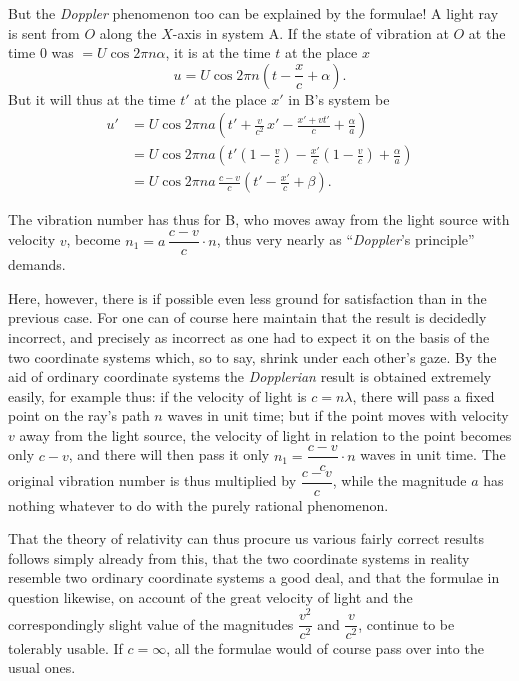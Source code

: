 \documentclass[12pt,a4paper]{article}
\begin{document}
But the \emph{Doppler} phenomenon too can be explained by the formulae! A
light ray is sent from $O$ along the $X$-axis in system A. If the state of
vibration at $O$ at the time $0$ was $= U \cos 2\pi n\alpha$, it is at the
time $t$ at the place $x$
\[
  u = U \cos 2\pi n \left(t - \frac{x}{c} + \alpha\right).
\]
But it will thus at the time $t'$ at the place $x'$ in B's system be
\begin{align*}
  u' &= U \cos 2\pi na\left(t' + \frac{v}{c^{2}}\,x' - \frac{x' + vt'}{c}
        + \frac{\alpha}{a}\right)\\
     &= U \cos 2\pi na\left(t'\left(1 - \frac{v}{c}\right)
        - \frac{x'}{c}\left(1 - \frac{v}{c}\right) + \frac{\alpha}{a}\right)\\
     &= U \cos 2\pi na\,\frac{c - v}{c}\left(t' - \frac{x'}{c} + \beta\right).
\end{align*}

The vibration number has thus for B, who moves away from the light source with
velocity $v$, become $n_{1} = a\,\dfrac{c - v}{c}\cdot n$, thus very nearly as
``\emph{Doppler}'s principle'' demands.

Here, however, there is if possible even less ground for satisfaction than in
the previous case. For one can of course here maintain that the result is
decidedly incorrect, and precisely as incorrect as one had to expect it on the
basis of the two coordinate systems which, so to say, shrink under each
other's gaze. By the aid of ordinary coordinate systems the
\emph{Dopplerian} result is obtained extremely easily, for example thus: if
the velocity of light is $c = n\lambda$, there will pass a fixed point on the
ray's path $n$ waves in unit time; but if the point moves with velocity $v$
away from the light source, the velocity of light in relation to the point
becomes only $c - v$, and there will then pass it only
$n_{1} = \dfrac{c - v}{c}\cdot n$ waves in unit time. The original vibration
number is thus multiplied by $\dfrac{c - v}{c}$, while the magnitude $a$ has
nothing whatever to do with the purely rational phenomenon.

That the theory of relativity can thus procure us various fairly correct
results follows simply already from this, that the two coordinate systems in
reality resemble two ordinary coordinate systems a good deal, and that the
formulae in question likewise, on account of the great velocity of light and
the correspondingly slight value of the magnitudes $\dfrac{v^{2}}{c^{2}}$ and
$\dfrac{v}{c^{2}}$, continue to be tolerably usable. If $c = \infty$, all the
formulae would of course pass over into the usual ones.
\end{document}
